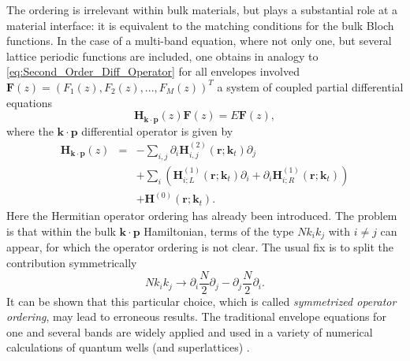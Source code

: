 The ordering is irrelevant within bulk materials, but plays a substantial
role at a material interface: it is equivalent to the matching conditions
for the bulk Bloch functions. In the case of a multi-band equation,
where not only one, but several lattice periodic functions are included,
one obtains in analogy to \ref{eq:Second_Order_Diff_Operator} for
all envelopes involved $\mathbf{F}(z)=(F_{1}(z),F_{2}(z),...,F_{M}(z))^{T}$
a system of coupled partial differential equations\begin{equation}
\mathbf{H}_{\mathbf{k}\cdot\mathbf{p}}(z)\mathbf{F}(z)=E\mathbf{F}(z),\label{eq:General_Envelope_Function_Schr_Eq}\end{equation}
where the $\mathbf{k}\cdot\mathbf{p}$ differential operator is given
by\begin{eqnarray}
\mathbf{H}_{\mathbf{k}\cdot\mathbf{p}}(z) & = & -\sum_{i,j}\partial_{i}\mathbf{H}_{i,j}^{(2)}(\mathbf{r};\mathbf{k}_{t})\partial_{j}\nonumber \\
 &  & +\sum_{i}\left(\mathbf{H}_{i;L}^{(1)}(\mathbf{r};\mathbf{k}_{t})\partial_{i}+\partial_{i}\mathbf{H}_{i;R}^{(1)}(\mathbf{r};\mathbf{k}_{t})\right)\nonumber \\
 &  & +\mathbf{H}^{(0)}(\mathbf{r};\mathbf{k}_{t}).\end{eqnarray}
Here the Hermitian operator ordering has already been introduced.
The problem is that within the bulk $\mathbf{k}\cdot\mathbf{p}$ Hamiltonian,
terms of the type $Nk_{i}k_{j}$ with $i\neq j$ can appear, for which
the operator ordering is not clear. The usual fix is to split the
contribution symmetrically\begin{equation}
Nk_{i}k_{j}\rightarrow\partial_{i}\frac{N}{2}\partial_{j}-\partial_{j}\frac{N}{2}\partial_{i}.\label{eq:Symmetrized_Operator_Ordering}\end{equation}
It can be shown that this particular choice, which is called \emph{symmetrized
operator ordering}, may lead to erroneous results. The traditional
envelope equations for one and several bands are widely applied and
used in a variety of numerical calculations of quantum wells (and
superlattices) \citet{Altarelli1983,Bastard1981,Bastard1982,Eppenga1987,Chuang1991a}.

